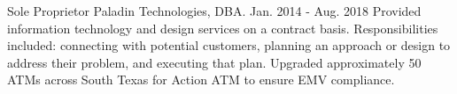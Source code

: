 

\begin{cventries}

  \cventry
    {Sole Proprietor} %
    {Paladin Technologies, DBA.} %
    {Jan. 2014 - Aug. 2018} %
    {} %
    {
		Provided information technology and design services on a
		contract basis. Responsibilities included: connecting with
		potential customers, planning an approach or design to address
		their problem, and executing that plan.
		Upgraded approximately 50 ATMs across South Texas
		for Action ATM to ensure EMV compliance.
    }

\end{cventries}

